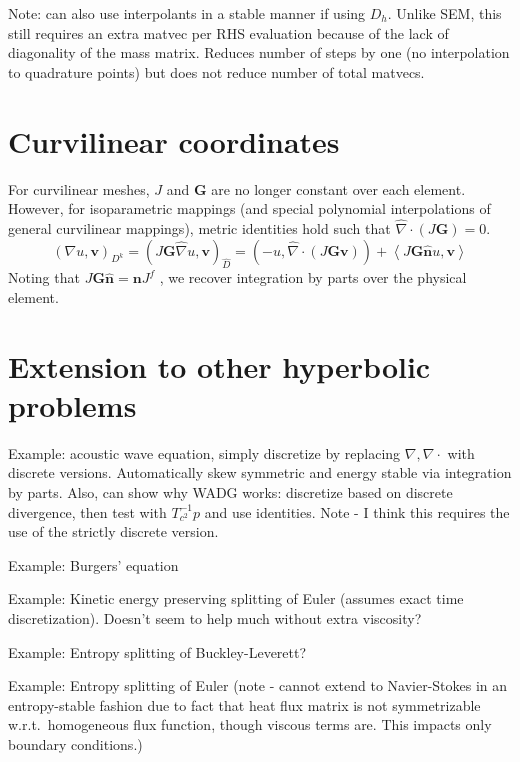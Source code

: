 \documentclass[preprint,10pt]{article}
\theoremstyle{definition}
\theoremstyle{lemma}
\newcommand{\LRp}[1]{\left( #1 \right)}
\newcommand{\LRa}[1]{\left\langle #1 \right\rangle}
\newcommand{\Grad} {\ensuremath{\nabla}}
\begin{document}
Note: can also use interpolants in a stable manner if using $D_h$.  Unlike SEM, this still requires an extra matvec per RHS evaluation because of the lack of diagonality of the mass matrix.  Reduces number of steps by one (no interpolation to quadrature points) but does not reduce number of total matvecs.  

\section{Curvilinear coordinates}

For curvilinear meshes, $J$ and $\bm{G}$ are no longer constant over each element.  However, for isoparametric mappings (and special polynomial interpolations of general curvilinear mappings), metric identities hold \cite{kopriva2006metric} such that $\widehat{\Grad} \cdot \LRp{J\bm{G}} = 0$.  
\[
\LRp{\Grad u,\bm{v}}_{D^k} = \LRp{J\bm{G}\widehat{\Grad} u,\bm{v}}_{\widehat{D}} = \LRp{-u,\widehat{\Grad} \cdot \LRp{J\bm{G}\bm{v}}}  + \LRa{J\bm{G}\widehat{\bm{n}} u,\bm{v}} 
\]
Noting that $J\bm{G}\widehat{\bm{n}} = \bm{n} J^f$ \cite{hesthaven2007nodal}, we recover integration by parts over the physical element.

\section{Extension to other hyperbolic problems}

Example: acoustic wave equation, simply discretize by replacing $\Grad, \Grad\cdot$ with discrete versions.  Automatically skew symmetric and energy stable via integration by parts.  Also, can show why WADG works: discretize based on discrete divergence, then test with $T_{c^2}^{-1}p$ and use identities.  Note - I think this requires the use of the strictly discrete version.  

Example: Burgers' equation

Example: Kinetic energy preserving splitting of Euler (assumes exact time discretization).  Doesn't seem to help much without extra viscosity?  

Example: Entropy splitting of Buckley-Leverett?

Example: Entropy splitting of Euler (note - cannot extend to Navier-Stokes in an entropy-stable fashion due to fact that heat flux matrix is not symmetrizable w.r.t.\ homogeneous flux function, though viscous terms are.  This impacts only boundary conditions.) 
\end{document}
